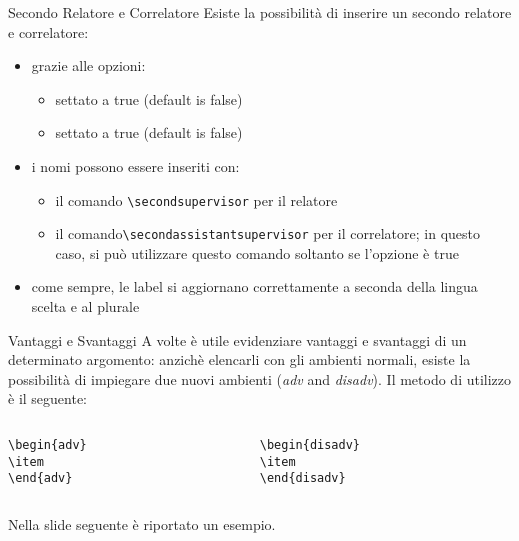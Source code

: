 \begin{frame}[t,fragile]{Secondo Relatore e Correlatore}\label{secondrel}
Esiste la possibilità di inserire un secondo relatore e correlatore:
\begin{itemize}
\item grazie alle opzioni:
\begin{itemize}
\item {} settato a true (default is false)
\item {} settato a true (default is false)
\end{itemize}
\item i nomi possono essere inseriti con:
\begin{itemize}
\item il comando \verb!\secondsupervisor! per il relatore
\item il comando\verb!\secondassistantsupervisor! per il correlatore; in questo caso, si può utilizzare questo comando soltanto se l'opzione  è true
\end{itemize}
\item come sempre, le label si aggiornano correttamente a seconda della lingua scelta e al plurale
\end{itemize}
\end{frame}

\begin{frame}[t,fragile]{Vantaggi e Svantaggi}
A volte è utile evidenziare vantaggi e svantaggi di un determinato argomento: anzichè elencarli con gli ambienti normali, esiste la possibilità di impiegare due nuovi ambienti (\emph{adv} and \emph{disadv}). Il metodo di utilizzo è il seguente:
\begin{columns}
\begin{column}{0.3\paperwidth}
\begin{verbatim}
\begin{adv}
\item 
\end{adv}
\end{verbatim}
\end{column}
\begin{column}{0.3\paperwidth}
\begin{verbatim}
\begin{disadv}
\item 
\end{disadv}
\end{verbatim}
\end{column}
\end{columns}
\bigskip
Nella slide seguente è riportato un esempio.
\end{frame}

